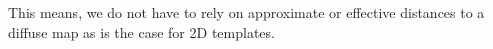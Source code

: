 \documentclass[doublespace,draft,nopageskip]{VTthesis} %
\begin{document}
\begin{appendices}
	\noindent This means, we do not have to rely on approximate or effective distances to a diffuse map as is the case for 2D templates.
	
	
	

\end{appendices}
\end{document}
